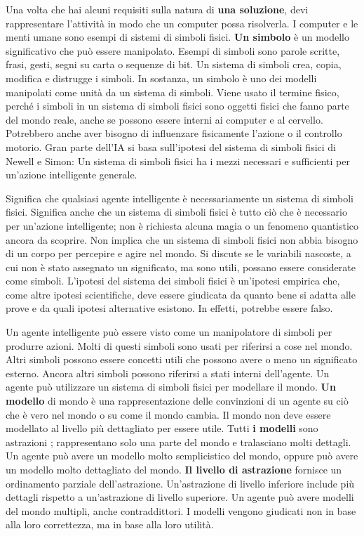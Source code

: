 \documentclass[a4paper]{extarticle}
\begin{document}
Una volta che hai alcuni requisiti sulla natura di \textbf{una soluzione}, devi rappresentare l'attività in modo che un computer possa risolverla. I computer e le menti umane sono esempi di sistemi di simboli fisici. \textbf{Un simbolo} è un modello significativo che può essere manipolato. Esempi di simboli sono parole scritte, frasi, gesti, segni su carta o sequenze di bit. Un sistema di simboli crea, copia, modifica e distrugge i simboli. In sostanza, un simbolo è uno dei modelli manipolati come unità da un sistema di simboli. Viene usato il termine fisico, perché i simboli in un sistema di simboli fisici sono oggetti fisici che fanno parte del mondo reale, anche se possono essere interni ai computer e al cervello. Potrebbero anche aver bisogno di influenzare fisicamente l'azione o il controllo motorio. Gran parte dell'IA si basa sull'ipotesi del sistema di simboli fisici di Newell e Simon: Un sistema di simboli fisici ha i mezzi necessari e sufficienti per un'azione intelligente generale.

Significa che qualsiasi agente intelligente è necessariamente un sistema di simboli fisici. Significa anche che un sistema di simboli fisici è tutto ciò che è necessario per un'azione intelligente; non è richiesta alcuna magia o un fenomeno quantistico ancora da scoprire. Non implica che un sistema di simboli fisici non abbia bisogno di un corpo per percepire e agire nel mondo. Si discute se le variabili nascoste, a cui non è stato assegnato un significato, ma sono utili, possano essere considerate come simboli. L'ipotesi del sistema dei simboli fisici è un'ipotesi empirica che, come altre ipotesi scientifiche, deve essere giudicata da quanto bene si adatta alle prove e da quali ipotesi alternative esistono. In effetti, potrebbe essere falso.

Un agente intelligente può essere visto come un manipolatore di simboli per produrre azioni. Molti di questi simboli sono usati per riferirsi a cose nel mondo. Altri simboli possono essere concetti utili che possono avere o meno un significato esterno. Ancora altri simboli possono riferirsi a stati interni dell'agente. Un agente può utilizzare un sistema di simboli fisici per modellare il mondo. \textbf{Un modello} di mondo è una rappresentazione delle convinzioni di un agente su ciò che è vero nel mondo o su come il mondo cambia. Il mondo non deve essere modellato al livello più dettagliato per essere utile. Tutti \textbf{i modelli} sono astrazioni ; rappresentano solo una parte del mondo e tralasciano molti dettagli. Un agente può avere un modello molto semplicistico del mondo, oppure può avere un modello molto dettagliato del mondo. \textbf{Il livello di astrazione} fornisce un ordinamento parziale dell'astrazione. Un'astrazione di livello inferiore include più dettagli rispetto a un'astrazione di livello superiore. Un agente può avere modelli del mondo multipli, anche contraddittori. I modelli vengono giudicati non in base alla loro correttezza, ma in base alla loro utilità.
\end{document}
